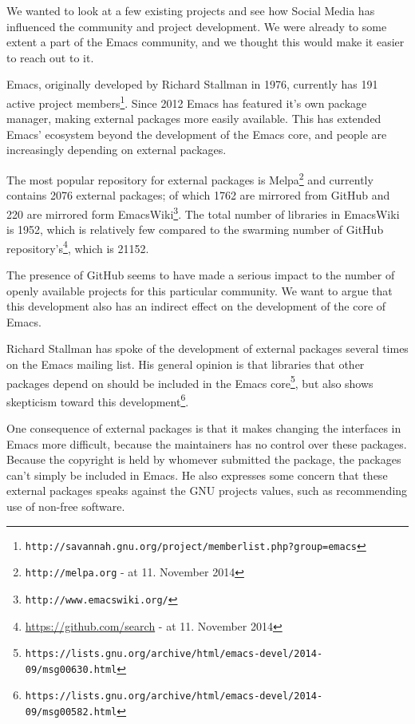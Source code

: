 \documentclass[a4paper,11pt]{article} %
\begin{document}
We wanted to look at a few existing projects and see how Social Media has
influenced the community and project development. We were already to some
extent a part of the Emacs community, and we thought this would make it
easier to reach out to it.

Emacs, originally developed by Richard Stallman in 1976, currently has
\num{191} active project
members\footnote{\texttt{http://savannah.gnu.org/project/memberlist.php?group=emacs}}.
Since \num{2012} Emacs has featured it's own package manager, making
external packages more easily available. This has extended Emacs' ecosystem
beyond the development of the Emacs core, and people are increasingly
depending on external packages.

The most popular repository for external packages is
Melpa\footnote{\texttt{http://melpa.org} - at 11. November 2014} and
currently contains \num{2076} external packages; of which \num{1762} are
mirrored from GitHub and \num{220} are mirrored form
EmacsWiki\footnote{\texttt{http://www.emacswiki.org/}}. The total number of
libraries in EmacsWiki is \num{1952}, which is relatively few compared to
the swarming number of GitHub
repository's\footnote{\href{https://github.com/search?utf8=\%E2\%9C\%93\&q=language\%3Aemacs-lisp\&type=Repositories\&ref=searchresults}{https://github.com/search}
  - at 11. November 2014}, which is \num{21152}.

The presence of GitHub seems to have made a serious impact to the number of
openly available projects for this particular community. We want to argue
that this development also has an indirect effect on the development of the
core of Emacs.

Richard Stallman has spoke of the development of external packages several
times on the Emacs mailing list. His general opinion is that libraries that
other packages depend on should be included in the Emacs
core\footnote{\texttt{https://lists.gnu.org/archive/html/emacs-devel/2014-09/msg00630.html}},
but also shows skepticism toward this
development\footnote{\texttt{https://lists.gnu.org/archive/html/emacs-devel/2014-09/msg00582.html}}.

One consequence of external packages is that it makes changing the
interfaces in Emacs more difficult, because the maintainers has no control
over these packages. Because the copyright is held by whomever submitted the
package, the packages can't simply be included in Emacs. He also expresses
some concern that these external packages speaks against the GNU projects
values, such as recommending use of non-free software.
\end{document}
